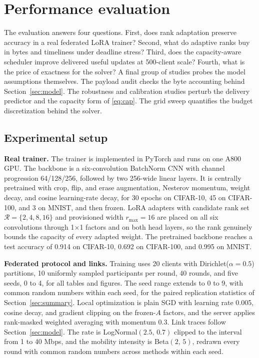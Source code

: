 \documentclass[preprint,12pt]{elsarticle}
\begin{document}
\section{Performance evaluation}
\label{sec:eval}

The evaluation answers four questions. First, does rank adaptation preserve accuracy in a real federated LoRA trainer? Second, what do adaptive ranks buy in bytes and timeliness under deadline stress? Third, does the capacity-aware scheduler improve delivered useful updates at 500-client scale? Fourth, what is the price of exactness for the solver? A final group of studies probes the model assumptions themselves. The payload audit checks the byte accounting behind Section~\ref{sec:model}. The robustness and calibration studies perturb the delivery predictor and the capacity form of \eqref{eq:cap}. The grid sweep quantifies the budget discretization behind the solver.

\subsection{Experimental setup}
\textbf{Real trainer.} The trainer is implemented in PyTorch and runs on one A800 GPU. The backbone is a six-convolution BatchNorm CNN with channel progression 64/128/256, followed by two 256-wide linear layers. It is centrally pretrained with crop, flip, and erase augmentation, Nesterov momentum, weight decay, and cosine learning-rate decay, for 30 epochs on CIFAR-10, 45 on CIFAR-100, and 3 on MNIST, and then frozen. LoRA adapters with candidate rank set $\mathcal R=\{2,4,8,16\}$ and provisioned width $r_{\max}=16$ are placed on all six convolutions through 1$\times$1 factors and on both head layers, so the rank genuinely bounds the capacity of every adapted weight. The pretrained backbone reaches a test accuracy of 0.914 on CIFAR-10, 0.692 on CIFAR-100, and 0.995 on MNIST.

\textbf{Federated protocol and links.} Training uses 20 clients with Dirichlet($\alpha{=}0.5$) partitions, 10 uniformly sampled participants per round, 40 rounds, and five seeds, 0 to 4, for all tables and figures. The seed range extends to 0 to 9, with common random numbers within each seed, for the paired replication statistics of Section~\ref{sec:summary}. Local optimization is plain SGD with learning rate 0.005, cosine decay, and gradient clipping on the frozen-$A$ factors, and the server applies rank-masked weighted averaging with momentum 0.3. Link traces follow Section~\ref{sec:model}. The rate is LogNormal$(2.5,\,0.7)$ clipped to the interval from 1 to 40 Mbps, and the mobility intensity is Beta$(2,\,5)$, redrawn every round with common random numbers across methods within each seed.
\end{document}

